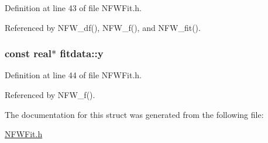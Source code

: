Definition at line 43 of file NFWFit.h.



Referenced by NFW\_\-df(), NFW\_\-f(), and NFW\_\-fit().

\subsubsection[{y}]{\setlength{\rightskip}{0pt plus 5cm}const {\bf real}$\ast$ {\bf fitdata::y}}\label{structfitdata_aa239f7ab3fb04fcc026ba80ea2cc077e}


Definition at line 44 of file NFWFit.h.



Referenced by NFW\_\-f().



The documentation for this struct was generated from the following file:\begin{DoxyCompactItemize}
\item 
\hyperlink{NFWFit_8h}{NFWFit.h}\end{DoxyCompactItemize}
